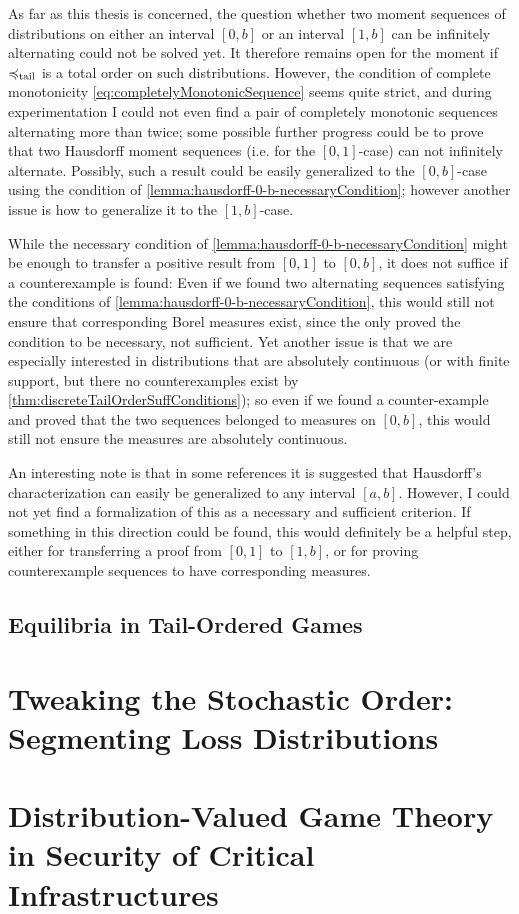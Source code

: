 \documentclass[a4paper]{scrreprt}
\begin{document}
    As far as this thesis is concerned, the question whether two moment sequences of distributions on either an interval $[0, b]$ or an interval $[1, b]$ can be infinitely alternating could not be solved yet. It therefore remains open for the moment if $\preccurlyeq_{\text{tail}}$ is a total order on such distributions.
    However, the condition of complete monotonicity \eqref{eq:completelyMonotonicSequence} seems quite strict, and during experimentation I could not even find a pair of completely monotonic sequences alternating more than twice; some possible further progress could be to prove that two Hausdorff moment sequences (i.e. for the $[0, 1]$-case) can not infinitely alternate. Possibly, such a result could be easily generalized to the $[0, b]$-case using the condition of \ref{lemma:hausdorff-0-b-necessaryCondition}; however another issue is how to generalize it to the $[1, b]$-case.
    
    While the necessary condition of \ref{lemma:hausdorff-0-b-necessaryCondition} might be enough to transfer a positive result from $[0, 1]$ to $[0, b]$, it does not suffice if a counterexample is found: Even if we found two alternating sequences satisfying the conditions of \ref{lemma:hausdorff-0-b-necessaryCondition}, this would still not ensure that corresponding Borel measures exist, since the only proved the condition to be necessary, not sufficient.
    Yet another issue is that we are especially interested in distributions that 
    are absolutely continuous (or with finite support, but there no counterexamples exist by \ref{thm:discreteTailOrderSuffConditions}); so even if we found a counter-example and proved that the two sequences belonged to measures on $[0, b]$, this would still not ensure the measures are absolutely continuous.
    
    An interesting note is that in some references it is suggested that Hausdorff's characterization can easily be generalized to any interval $[a, b]$.
    However, I could not yet find a formalization of this as a necessary and sufficient criterion. If something in this direction could be found, this would definitely be a helpful step, either for transferring a proof from $[0, 1]$ to $[1, b]$, or for proving counterexample sequences to have corresponding measures.
    
    
    \section{Equilibria in Tail-Ordered Games}
    
    
    \chapter{Tweaking the Stochastic Order: Segmenting Loss Distributions}
    
    
    \chapter{Distribution-Valued Game Theory in Security of Critical Infrastructures}
    
\end{document}
